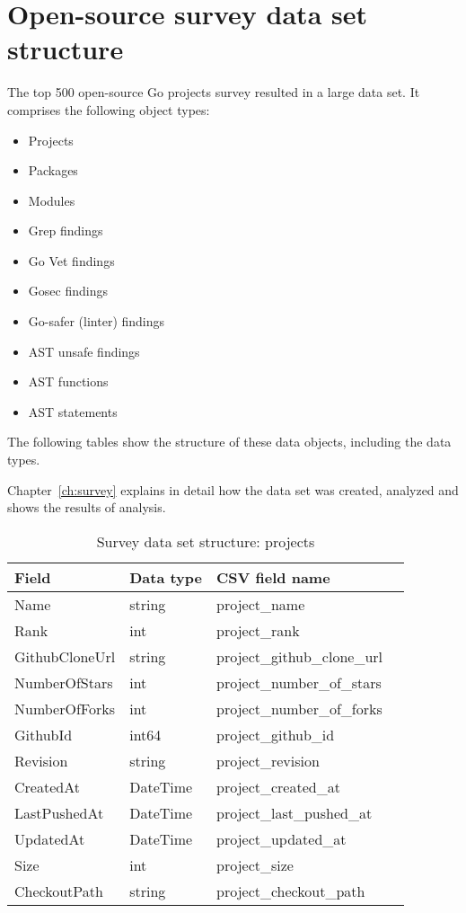
\chapter{Open-source survey data set structure}\label{ch:data-structure}

The top 500 open-source Go projects survey resulted in a large data set.
It comprises the following object types:

\begin{itemize}
    \item Projects
    \item Packages
    \item Modules
    \item Grep findings
    \item Go Vet findings
    \item Gosec findings
    \item Go-safer (linter) findings
    \item AST unsafe findings
    \item AST functions
    \item AST statements
\end{itemize}

The following tables show the structure of these data objects, including the data types.

Chapter~\ref{ch:survey} explains in detail how the data set was created, analyzed and shows the results of analysis.

\begin{table}[h]
    \centering
    \caption{Survey data set structure: projects}
    \label{tbl:datastructure-projects}
    \begin{tabular}{llll}
        \toprule
        Field & Data type & CSV field name \\
        \midrule
        Name           & string   & project\_name \\
        Rank           & int      & project\_rank \\
        GithubCloneUrl & string   & project\_github\_clone\_url \\
        NumberOfStars  & int      & project\_number\_of\_stars \\
        NumberOfForks  & int      & project\_number\_of\_forks \\
        GithubId       & int64    & project\_github\_id \\
        Revision       & string   & project\_revision \\
        CreatedAt      & DateTime & project\_created\_at \\
        LastPushedAt   & DateTime & project\_last\_pushed\_at \\
        UpdatedAt      & DateTime & project\_updated\_at \\
        Size           & int      & project\_size \\
        CheckoutPath   & string   & project\_checkout\_path \\
        \bottomrule
    \end{tabular}
\end{table}

